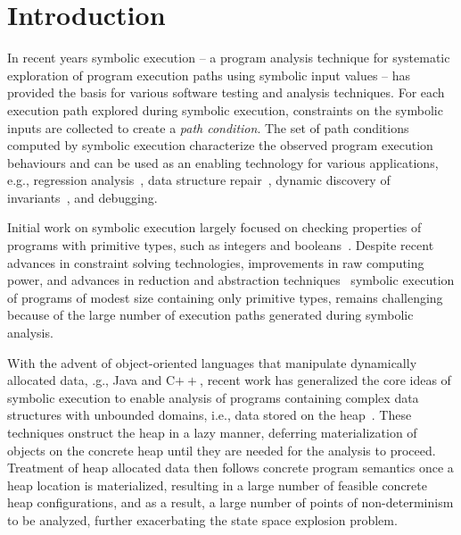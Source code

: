 \section{Introduction}

In recent years symbolic execution --
a program analysis technique for systematic exploration of
program execution paths using symbolic input values -- has provided
the basis for various software testing and analysis techniques.
For each execution path explored during symbolic execution, constraints
on the symbolic inputs are collected to create a \emph{path
condition}. The set of path conditions computed by symbolic execution
characterize the observed program execution behaviours and can
be used as an enabling technology for various applications, e.g., 
regression 
analysis~\cite{backes:2012,Godefroid:SAS11,Person:FSE08,person:pldi2011,Ramos:2011,Yang:ISSTA12}, 
data structure repair~\cite{KhurshidETAL05RepairingStructurally}, dynamic
discovery of invariants~\cite{CsallnerETAL08DySy,Zhang:ISSTA14}, 
and debugging\cite{Ma:2011}. 

Initial work on symbolic execution largely focused on checking 
properties of programs with primitive types, such as integers and 
booleans~\cite{clarke76TSE,King:76}. Despite recent advances
in constraint solving technologies, improvements in
raw computing power, and advances in reduction
and abstraction techniques~\cite{AnandETAL2009AbsSymExe,Godefroid:POPL07}
symbolic execution of programs of modest size containing only
primitive types, remains challenging
because of the large number of execution paths generated
during symbolic analysis. 

With the advent of object-oriented
languages that manipulate dynamically allocated data,
 .g., Java and C$++$, recent work has generalized the core ideas of 
symbolic execution to enable analysis of programs containing
complex data structures with unbounded domains, i.e., data stored
on the heap~\cite{Kiasan06,Kiasan07,GSE03}.
These techniques onstruct the heap in a lazy manner, 
deferring materialization of objects on the concrete heap until
they are needed for the analysis to proceed.
Treatment of
heap allocated data then follows concrete program semantics 
once a heap location is materialized, resulting in a large number
of feasible concrete heap configurations, and as a result, a large
number of points of 
non-determinism to be analyzed, further exacerbating 
the state space explosion problem.

